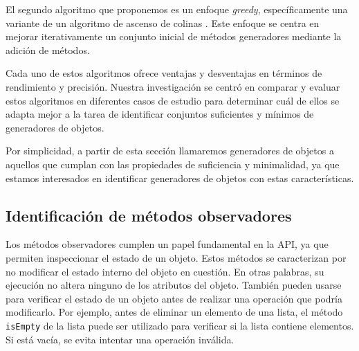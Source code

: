El segundo algoritmo que proponemos es un enfoque \emph{greedy}, específicamente una variante de un algoritmo de ascenso de colinas \cite{}. Este enfoque se centra en mejorar iterativamente un conjunto inicial de métodos generadores mediante la adición de métodos.


Cada uno de estos algoritmos ofrece ventajas y desventajas en términos de rendimiento y precisión. Nuestra investigación se centró en comparar y evaluar estos algoritmos en diferentes casos de estudio para determinar cuál de ellos se adapta mejor a la tarea de identificar conjuntos suficientes y mínimos de generadores de objetos.


Por simplicidad, a partir de esta sección llamaremos generadores de objetos a aquellos que cumplan con las propiedades de suficiencia y minimalidad, ya que estamos interesados en identificar generadores de objetos con estas características.


\subsection{Identificación de métodos observadores}

 Los métodos observadores cumplen un papel fundamental en la API, ya que permiten inspeccionar el estado de un objeto. Estos métodos se caracterizan por no modificar el estado interno del objeto en cuestión. En otras palabras, su ejecución no altera ninguno de los atributos del objeto.
  También pueden usarse para verificar el estado de un objeto antes de realizar una operación que podría modificarlo.
 Por ejemplo, antes de eliminar un elemento de una lista, el método \texttt{isEmpty} de la lista puede ser utilizado para verificar si la lista contiene elementos. Si está vacía, se evita intentar una operación inválida.

